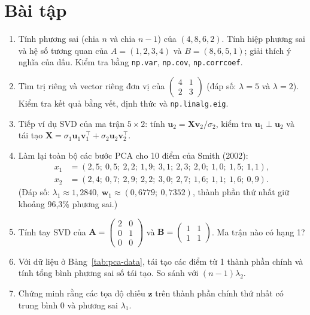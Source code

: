 \section{Bài tập}
\begin{enumerate}
    \item Tính phương sai (chia $n$ và chia $n - 1$) của $(4, 8, 6, 2)$. Tính hiệp phương sai và hệ số tương quan của $A = (1, 2, 3, 4)$ và $B = (8, 6, 5, 1)$; giải thích ý nghĩa của dấu. Kiểm tra bằng \texttt{np.var}, \texttt{np.cov}, \texttt{np.corrcoef}.
    \item Tìm trị riêng và vector riêng đơn vị của $\begin{pmatrix} 4 & 1 \\ 2 & 3 \end{pmatrix}$ (đáp số: $\lambda = 5$ và $\lambda = 2$). Kiểm tra kết quả bằng vết, định thức và \texttt{np.linalg.eig}.
    \item Tiếp ví dụ SVD của ma trận $5 \times 2$: tính $\mathbf{u}_2 = \mathbf{X}\mathbf{v}_2/\sigma_2$, kiểm tra $\mathbf{u}_1 \perp \mathbf{u}_2$ và tái tạo $\mathbf{X} = \sigma_1\mathbf{u}_1\mathbf{v}_1^\top + \sigma_2\mathbf{u}_2\mathbf{v}_2^\top$.
    \item Làm lại toàn bộ các bước PCA cho 10 điểm của Smith (2002):
    \[
    \begin{aligned}
        x_1 &= (2{,}5;\ 0{,}5;\ 2{,}2;\ 1{,}9;\ 3{,}1;\ 2{,}3;\ 2{,}0;\ 1{,}0;\ 1{,}5;\ 1{,}1),\\
        x_2 &= (2{,}4;\ 0{,}7;\ 2{,}9;\ 2{,}2;\ 3{,}0;\ 2{,}7;\ 1{,}6;\ 1{,}1;\ 1{,}6;\ 0{,}9).
    \end{aligned}
    \]
    (Đáp số: $\lambda_1 \approx 1{,}2840$, $\mathbf{w}_1 \approx (0{,}6779;\ 0{,}7352)$, thành phần thứ nhất giữ khoảng 96,3\% phương sai.)
    \item Tính tay SVD của $\mathbf{A} = \begin{pmatrix} 2 & 0 \\ 0 & 1 \\ 0 & 0 \end{pmatrix}$ và $\mathbf{B} = \begin{pmatrix} 1 & 1 \\ 1 & 1 \end{pmatrix}$. Ma trận nào có hạng 1?
    \item Với dữ liệu ở Bảng~\ref{tab:pca-data}, tái tạo các điểm từ 1 thành phần chính và tính tổng bình phương sai số tái tạo. So sánh với $(n - 1)\lambda_2$.
    \item Chứng minh rằng các tọa độ chiếu $\mathbf{z}$ trên thành phần chính thứ nhất có trung bình 0 và phương sai $\lambda_1$.

\end{enumerate}

